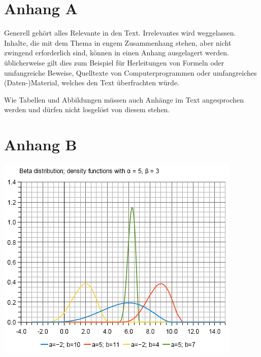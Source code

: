 \pagebreak

\section*{Anhang A}
\label{anhang_a}
Generell gehört alles Relevante in den Text. Irrelevantes wird weggelassen. Inhalte, die mit dem Thema in engem Zusammenhang stehen, aber nicht zwingend erforderlich sind, können in einen Anhang ausgelagert werden. üblicherweise gilt dies zum Beispiel für Herleitungen von Formeln oder umfangreiche Beweise, Quelltexte von Computerprogrammen oder umfangreiches (Daten-)Material, welches den Text überfrachten würde.

Wie Tabellen und Abbildungen müssen auch Anhänge im Text angesprochen werden und dürfen nicht losgelöst von diesem stehen.

\pagebreak


\section*{Anhang B}
\label{anhang_b}

\includegraphics{source/img/graph.png}

\pagebreak

